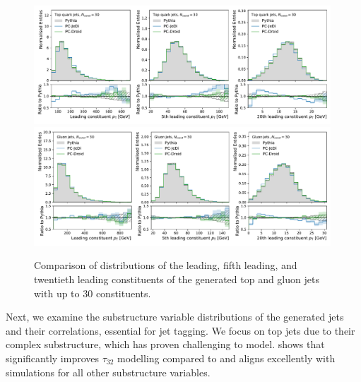 \begin{figure}[htpb]
    \centering
    \includegraphics[width=0.99\textwidth]{Figures/jet_generation/droid/30/csts/t/100/t_leading_constituents.pdf} \\
    \includegraphics[width=0.99\textwidth]{Figures/jet_generation/droid/30/csts/g/100/g_leading_constituents.pdf}
    \caption{Comparison of \pt distributions of the leading, fifth leading, and twentieth leading constituents of the generated top and gluon jets with up to 30 constituents.}
    \label{fig:const-pt_dist-30}
\end{figure}

Next, we examine the substructure variable distributions of the generated jets and their correlations, essential for jet tagging.
We focus on top jets due to their complex substructure, which has proven challenging to model.
 shows that \pcdroid significantly improves $\tau_{32}$ modelling compared to \pcjedi and aligns excellently with \pythia simulations for all other substructure variables.

